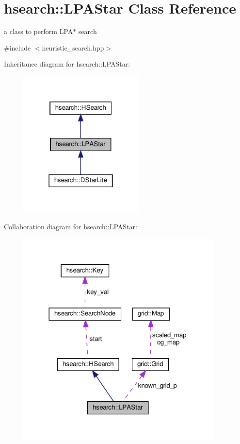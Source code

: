 \hypertarget{classhsearch_1_1LPAStar}{}\section{hsearch\+:\+:L\+P\+A\+Star Class Reference}
\label{classhsearch_1_1LPAStar}


a class to perform L\+P\+A$\ast$ search  




{\ttfamily \#include $<$heuristic\+\_\+search.\+hpp$>$}



Inheritance diagram for hsearch\+:\+:L\+P\+A\+Star\+:\nopagebreak
\begin{figure}[H]
\begin{center}
\leavevmode
\includegraphics[width=178pt]{d5/da1/classhsearch_1_1LPAStar__inherit__graph}
\end{center}
\end{figure}


Collaboration diagram for hsearch\+:\+:L\+P\+A\+Star\+:\nopagebreak
\begin{figure}[H]
\begin{center}
\leavevmode
\includegraphics[width=293pt]{dd/d4d/classhsearch_1_1LPAStar__coll__graph}
\end{center}
\end{figure}

